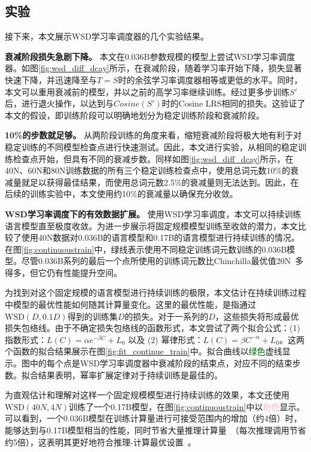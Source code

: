 \subsection{实验}
\label{sec:wsd_experiments_continoustrain}
接下来，本文展示WSD学习率调度器的几个实验结果。

\textbf{衰减阶段损失急剧下降。} 本文在0.036B参数规模的模型上尝试WSD学习率调度器。如图\ref{fig:wsd_diff_dcay}所示，在衰减阶段，随着学习率开始下降，损失显著快速下降，并迅速降至与$T = S$时的余弦学习率调度器相等或更低的水平。同时，本文可以重用衰减前的模型，并以之前的高学习率继续训练。经过更多步训练$S'$后，进行退火操作，以达到与$Cosine(S')$时的Cosine LRS相同的损失。这验证了本文的假设，即训练阶段可以明确地划分为稳定训练阶段和衰减阶段。

\textbf{10\%的步数就足够。} 从两阶段训练的角度来看，缩短衰减阶段将极大地有利于对稳定训练的不同模型检查点进行快速测试。因此，本文进行实验，从相同的稳定训练检查点开始，但具有不同的衰减步数。同样如图\ref{fig:wsd_diff_dcay}所示，在40N、60N和80N训练数据的所有三个稳定训练检查点中，使用总词元数10\%的衰减量就足以获得最佳结果，而使用总词元数2.5\%的衰减量则无法达到。因此，在后续的训练实验中，本文使用约10\%的衰减量以确保充分收敛。

\textbf{WSD学习率调度下的有效数据扩展。} 使用WSD学习率调度，本文可以持续训练语言模型直至极度收敛。为进一步展示将固定规模模型训练至收敛的潜力，本文比较了使用40N数据对0.036B的语言模型和0.17B的语言模型进行持续训练的情况。
在图\ref{fig:continuoustrain}中，绿线表示使用不同稳定训练词元数训练的0.036B模型。尽管0.036B系列的最后一个点所使用的训练词元数比Chinchilla最优值20N~\citep{hoffmann2022training}多得多，但它仍有性能提升空间。


为找到对这个固定规模的语言模型进行持续训练的极限，本文估计在持续训练过程中模型的最优性能如何随其计算量变化。这里的最优性能，是指通过$\text{WSD}(D, 0.1D)$得到的训练集$D$的损失。对于一系列的$D$，这些损失将形成最优损失包络线。由于不确定损失包络线的函数形式，本文尝试了两个拟合公式：(1) 指数形式：$L(C) = \alpha e^{-\beta C} + L_0$ 以及 (2) 幂律形式：$L(C) = \beta C^{-\alpha} + L_0$。这两个函数的拟合结果展示在图\ref{fig:fit_continue_train}中。拟合曲线以\textcolor{darkgreen}{绿色}虚线显示。图中的每个点是WSD学习率调度器中衰减阶段的结束点，对应不同的结束步数。拟合结果表明，幂率扩展定律对于持续训练是最佳的。 





为直观估计和理解对这样一个固定规模模型进行持续训练的效果，本文还使用$\text{WSD}(40N, 4N)$训练了一个0.17B模型，在图\ref{fig:continuoustrain}中以\textcolor{pink}{粉色}显示。可以看到，一个0.036B模型在训练计算量进行可接受范围内的增加（约4倍）时，能够达到与0.17B模型相当的性能，同时节省大量推理计算量~\citep{sardana2023beyond}（每次推理调用节省约5倍），这表明其更好地符合推理-计算最优设置~\citep{sardana2023beyond}。 


